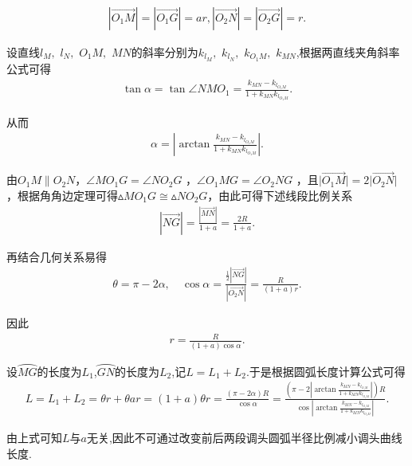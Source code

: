\documentclass[../main.tex]{subfiles}
\begin{document}
\begin{align}\label{1.........35}
\left| \overrightarrow{O_1M} \right|=\left| \overrightarrow{O_1G} \right|=ar,\left| \overrightarrow{O_2N} \right|=\left| \overrightarrow{O_2G} \right|=r.    
\end{align}
\par 设直线$l_M,$ $l_N,$ $O_1M,$ $MN$的斜率分别为$k_{l_M},$ $k_{l_N},$ $k_{O_1M},$ $k_{MN}$,根据两直线夹角斜率公式可得
\begin{align}\label{1.........36}
\tan \alpha =\tan \angle NMO_1=\frac{k_{MN}-k_{l_{O_1M}}}{1+k_{MN}k_{l_{O_1M}}}.
\end{align}
\par 从而
\begin{align}\label{1.........37}
\alpha =\left| \arctan \frac{k_{MN}-k_{l_{O_1M}}}{1+k_{MN}k_{l_{O_1M}}} \right|.
\end{align}
\par 由\(O_1M\parallel O_2N\)，\(\angle MO_1G=\angle NO_2G\) ，\(\angle O_1MG=\angle O_2NG\) ，且\(\vert\overrightarrow{O_1M}\vert = 2\vert\overrightarrow{O_2N}\vert\) ，根据角角边定理可得$\vartriangle MO_1G\cong \vartriangle NO_2G$，由此可得下述线段比例关系
\begin{align}\label{1.........38}
\left| \overrightarrow{NG} \right|=\frac{\left| \overrightarrow{MN} \right|}{1+a}=\frac{2R}{1+a}.
\end{align}
\par 再结合几何关系易得
\begin{align}\label{1.........39}
\theta =\pi -2\alpha ,\quad \cos \alpha =\frac{\frac{1}{2}\left| \overrightarrow{NG} \right|}{\left| \overrightarrow{O_2N} \right|}=\frac{R}{\left( 1+a \right) r}.
\end{align}
\par 因此
\begin{align}\label{1.........40}
r=\frac{R}{\left( 1+a \right) \cos \alpha}.
\end{align}
\par 设$\wideparen{MG}$的长度为$L_1$,$\wideparen{GN}$的长度为$L_2$,记$L=L_1+L_2$.于是根据圆弧长度计算公式可得
\begin{align}\label{equation-1}
L=L_1+L_2=\theta r+\theta ar=\left( 1+a \right) \theta r=\frac{\left( \pi -2\alpha \right) R}{\cos \alpha}=\frac{\left( \pi -2\left| \arctan \frac{k_{MN}-k_{l_{O_1M}}}{1+k_{MN}k_{l_{O_1M}}} \right| \right) R}{\cos \left| \arctan \frac{k_{MN}-k_{l_{O_1M}}}{1+k_{MN}k_{l_{O_1M}}} \right|}.
\end{align}
\par 由上式可知$L$与$a$无关,因此不可通过改变前后两段调头圆弧半径比例减小调头曲线长度.
\end{document}
